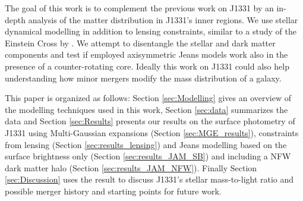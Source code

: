 The goal of this work is to complement the previous work on J1331 by an in-depth analysis of the matter distribution in J1331's inner regions. We use stellar dynamical modelling in addition to lensing constraints, similar to a study of the Einstein Cross by \citet{GlennEC}. We attempt to disentangle the stellar and dark matter components and test if employed axisymmetric Jeans models work also in the presence of a counter-rotating core. Ideally this work on J1331 could also help understanding how minor mergers modify the mass distribution of a galaxy.

This paper is organized as follows: Section \ref{sec:Modelling} gives an overview of the modelling techniques used in this work, Section \ref{sec:data} summarizes the data and Section \ref{sec:Results} presents our results on the surface photometry of J1331 using Multi-Gaussian expansions (Section \ref{sec:MGE_results}), constraints from lensing (Section \ref{sec:results_lensing}) and Jeans modelling based on the surface brightness only (Section \ref{sec:results_JAM_SB}) and including a NFW dark matter halo (Section \ref{sec:results_JAM_NFW}). Finally Section \ref{sec:Discussion} uses the result to discuss J1331's stellar mass-to-light ratio and possible merger history and starting points for future work.





